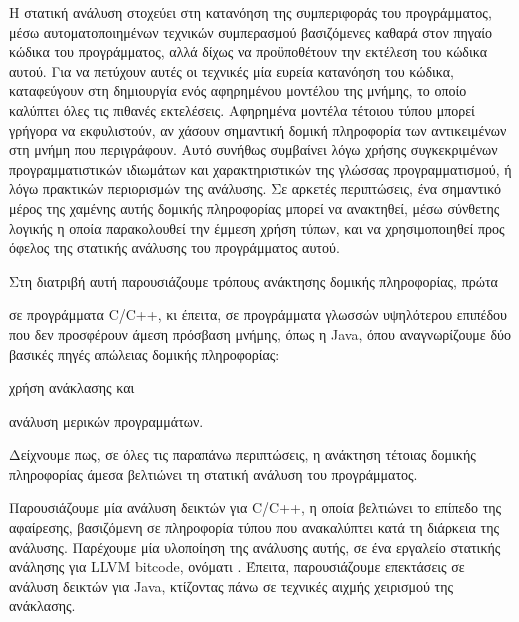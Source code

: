 
Η στατική ανάλυση στοχεύει στη κατανόηση της συμπεριφοράς του
προγράμματος, μέσω αυτοματοποιημένων τεχνικών συμπερασμού βασιζόμενες
καθαρά στον πηγαίο κώδικα του προγράμματος, αλλά δίχως να προϋποθέτουν
την εκτέλεση του κώδικα αυτού. Για να πετύχουν αυτές οι τεχνικές μία
ευρεία κατανόηση του κώδικα, καταφεύγουν στη δημιουργία ενός
αφηρημένου μοντέλου της μνήμης, το οποίο καλύπτει όλες τις πιθανές
εκτελέσεις. Αφηρημένα μοντέλα τέτοιου τύπου μπορεί γρήγορα να
εκφυλιστούν, αν χάσουν σημαντική δομική πληροφορία των αντικειμένων
στη μνήμη που περιγράφουν. Αυτό συνήθως συμβαίνει λόγω χρήσης
συγκεκριμένων προγραμματιστικών ιδιωμάτων και χαρακτηριστικών της
γλώσσας προγραμματισμού, ή λόγω πρακτικών περιορισμών της ανάλυσης.
Σε αρκετές περιπτώσεις, ένα σημαντικό μέρος της χαμένης αυτής δομικής
πληροφορίας μπορεί να ανακτηθεί, μέσω σύνθετης λογικής η οποία
παρακολουθεί την έμμεση χρήση τύπων, και να χρησιμοποιηθεί προς όφελος
της στατικής ανάλυσης του προγράμματος αυτού.

Στη διατριβή αυτή παρουσιάζουμε τρόπους ανάκτησης δομικής πληροφορίας,
πρώτα
\begin{inparaenum}[(i)]
\item σε προγράμματα {\en C/C++}, κι έπειτα, σε προγράμματα γλωσσών
  υψηλότερου επιπέδου που δεν προσφέρουν άμεση πρόσβαση μνήμης, όπως η
  {\en Java}, όπου αναγνωρίζουμε δύο βασικές πηγές απώλειας δομικής
  πληροφορίας:
\item χρήση ανάκλασης και
\item ανάλυση μερικών προγραμμάτων.
\end{inparaenum}
Δείχνουμε πως, σε όλες τις παραπάνω περιπτώσεις, η ανάκτηση τέτοιας
δομικής πληροφορίας άμεσα βελτιώνει τη στατική ανάλυση του
προγράμματος.

Παρουσιάζουμε μία ανάλυση δεικτών για {\en C/C++}, η οποία βελτιώνει
το επίπεδο της αφαίρεσης, βασιζόμενη σε πληροφορία τύπου που
ανακαλύπτει κατά τη διάρκεια της ανάλυσης. Παρέχουμε μία υλοποίηση της
ανάλυσης αυτής, σε ένα εργαλείο στατικής ανάλησης για {\en LLVM
  bitcode}, ονόματι {\en \cclyzer{}}.
%
Έπειτα, παρουσιάζουμε επεκτάσεις σε ανάλυση δεικτών για {\en Java},
κτίζοντας πάνω σε τεχνικές αιχμής χειρισμού της ανάκλασης. 

